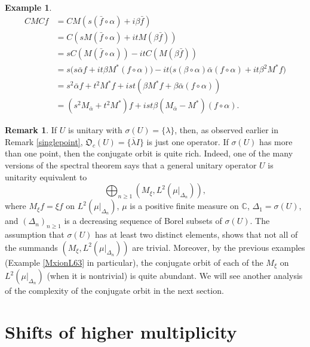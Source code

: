 \documentclass{dis}
\theoremstyle{plain}
\theoremstyle{definition}
\newtheorem{Example}[equation]{Example}
\newtheorem{Remark}[equation]{Remark}
\def\C{\mathbb{C}}
\renewcommand{\geq}{\geqslant}
\newcommand{\0}{{\color{lightgray}0}}
\begin{document}
\begin{Example}
\begin{align*}
C M C f &= C M (s (\bar f \circ \alpha) + i \beta \bar f)\\
& = C (s M (\bar f \circ \alpha) + i t M (\beta \bar f))\\
& = s C (M (\bar f \circ \alpha) ) - i t C(M (\beta \bar f))\\
& = s \Big(s \bar \alpha f + i t \beta M^{*}(f \circ \alpha)\Big) - i t \Big(s (\beta \circ \alpha) \bar \alpha (f \circ \alpha) + i t \beta^2 M^{*} f\Big)\\
& = s^2 \bar \alpha f + t^2 M^{*} f + i s t (\beta M^{*} f + \beta \bar \alpha (f \circ \alpha))\\
& = (s^2 M_{\bar \alpha} + t^2 M^{*}) f + i s t \beta (M_{\bar \alpha} - M^{*}) (f \circ \alpha).
\end{align*}
\end{Example}

\begin{Remark}\label{morethanone}
 If $U$ is unitary with $\sigma(U) = \{\lambda\}$, then, as observed earlier in Remark \ref{singlepoint},  $\mathfrak{O}_c(U) = \{\overline{\lambda} I\}$ is just one operator. If $\sigma(U)$ has more than one point, then the conjugate orbit is quite rich. Indeed, one of the many versions of the spectral theorem \cite[p.~304]{ConwayFA} says that a general unitary operator $U$ is unitarity equivalent to 
$$\bigoplus_{n \geq 1} (M_{\xi}, L^2(\mu|_{\Delta_n})),$$
where $M_{\xi} f = \xi f$ on $L^2(\mu|_{\Delta_n})$, $\mu$ is a positive finite measure on $\C$, $\Delta_1 = \sigma(U)$, and $(\Delta_n)_{n \geq 1}$ is a decreasing sequence of Borel subsets of $\sigma(U)$. The assumption that $\sigma(U)$ has at least two distinct elements, shows that not all of the summands $(M_{\xi}, L^2(\mu|_{\Delta_n}))$ are trivial. Moreover, by the previous examples (Example \ref{MxionL63} in particular), the conjugate orbit of  each of the $M_{\xi}$ on $L^2(\mu|_{\Delta_n})$ (when it is nontrivial)  is quite abundant. We will see another analysis of the complexity of the conjugate orbit in the next section. 
\end{Remark}

\section{Shifts of higher multiplicity}
\end{document}
